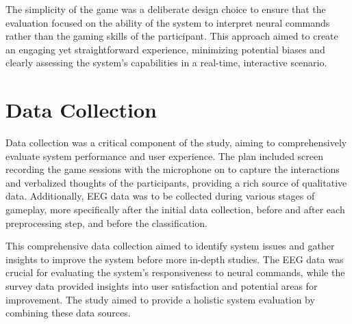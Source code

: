 The simplicity of the game was a deliberate design choice to ensure that the evaluation focused on the ability of the system to interpret neural commands rather than the gaming skills of the participant. 
This approach aimed to create an engaging yet straightforward experience, minimizing potential biases and clearly assessing the system's capabilities in a real-time, interactive scenario.

\section{Data Collection}
Data collection was a critical component of the study, aiming to comprehensively evaluate system performance and user experience. 
The plan included screen recording the game sessions with the microphone on to capture the interactions and verbalized thoughts of the participants, providing a rich source of qualitative data. 
Additionally, EEG data was to be collected during various stages of gameplay, more specifically after the initial data collection, before and after each preprocessing step, and before the classification.

This comprehensive data collection aimed to identify system issues and gather insights to improve the system before more in-depth studies. 
The EEG data was crucial for evaluating the system's responsiveness to neural commands, while the survey data provided insights into user satisfaction and potential areas for improvement. 
The study aimed to provide a holistic system evaluation by combining these data sources.


